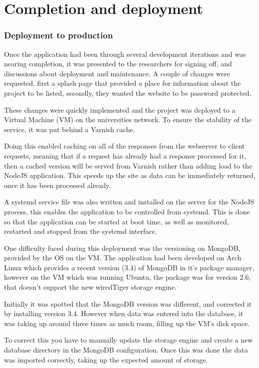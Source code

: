 \chapter{Completion and deployment}

\subsection{Deployment to production}
Once the application had been through several development iterations and was nearing completion, it was presented to the researchers for signing off, and discussions about deployment and maintenance. A couple of changes were requested, first a splash page that provided a place for information about the project to be listed, secondly, they wanted the website to be password protected. 

These changes were quickly implemented and the project was deployed to a Virtual Machine (VM) on the universities network. To ensure the stability of the service, it was put behind a Varnish\cite{varnish} cache.

Doing this enabled caching on all of the responses from the webserver to client requests, meaning that if a request has already had a response processed for it, then a cached version will be served from Varnish rather than adding load to the NodeJS application. This speeds up the site as data can be immediately returned, once it has been processed already.

A systemd\cite{systemd} service file was also written and installed on the server for the NodeJS process, this enables the application to be controlled from systemd. This is done so that the application can be started at boot time, as well as monitored, restarted and stopped from the systemd interface. 

One difficulty faced during this deployment was the versioning on MongoDB, provided by the OS on the VM. The application had been developed on Arch Linux which provides a recent version (3.4) of MongoDB in it's package manager, however on the VM which was running Ubuntu, the package was for version 2.6, that doesn't support the new wiredTiger\cite{tiger} storage engine. 

Initially it was spotted that the MongoDB version was different, and corrected it by installing version 3.4. However when data was entered into the database, it was taking up around three times as much room, filling up the VM's disk space. 

To correct this you have to manually update the storage engine and create a new database directory in the MongoDB configuration. Once this was done the data was imported correctly, taking up the expected amount of storage. 

